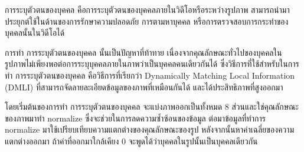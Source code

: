 การระบุตัวตนของบุคคล คือการระบุตัวตนของบุคคลภายในวิดีโอหรือระหว่างรูปภาพ สามารถนำมาประยุกต์ใช้ในด้านของการรักษาความปลอดภัย การตามหาบุคคล หรือการตรวจสอบการกระทำของบุคคลนั้นในวิดีโอได้
\par
การทำ การระบุตัวตนของบุคคล นั้นเป็นปัญหาที่ท้าทาย เนื่องจากคุณลักษณะทั่วไปของบุคคลในรูปภาพไม่เพียงพอต่อการระบุบุคคลภายในภาพว่าเป็นบุคคลคนเดียวกันได้ ซึ่งวิธีการที่ใช้สำหรับในการทำ การระบุตัวตนของบุคคล คือวิธีการที่เรียกว่า Dynamically Matching Local Information (DMLI) ที่สามารถจัดลายละเอียดข้อมูลของภาพที่เหมือนกันได้ และได้ประสิทธิภาพที่สูงออกมา
\par
โดยเริ่มต้นของการทำ การระบุตัวตนของบุคคล จะแบ่งภาพออกเป็นทั้งหมด 8 ส่วนและใช่คุณลักษณะของภาพมาทำ normalize ซึ่งจะช่วยในการลดความซ้ำซ้อนของข้อมูล ต่อมาข้อมูลที่ทำการ normalize มาใช้เปรียบเทียบความแตกต่างของคุณลักษณะของรูป หลังจากนั้นหาค่าเฉลี่ยของความแตกต่างออกมา ถ้าค่าที่ออกมาใกล้เคียง 0 จะพูดได้ว่าบุคคลในรูปนั้นเป็นบุคคลเดียวกัน